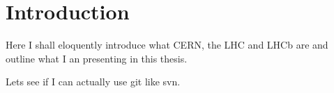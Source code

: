\chapter{Introduction}

Here I shall eloquently introduce what CERN, the LHC and LHCb are and outline what I an presenting in this thesis.

Lets see if I can actually use git like svn.
